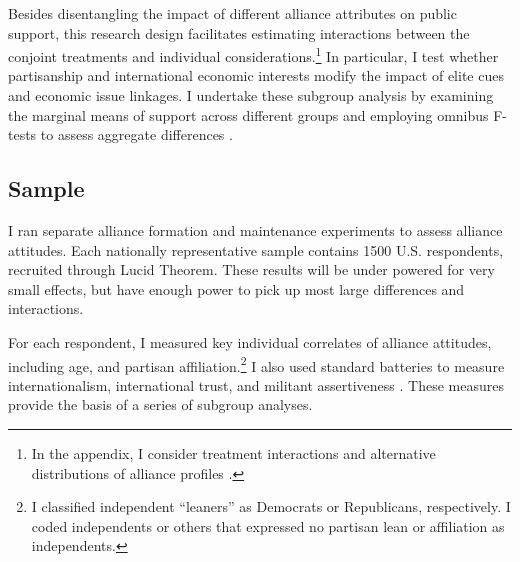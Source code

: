 \documentclass[12pt]{article}
\begin{document}
Besides disentangling the impact of different alliance attributes on public support, this research design facilitates estimating interactions between the conjoint treatments and individual considerations.\footnote{In the appendix, I consider treatment interactions and alternative distributions of alliance profiles \citep{delaCuestaetal2021}.}
In particular, I test whether partisanship and international economic interests modify the impact of elite cues and economic issue linkages. 
I undertake these subgroup analysis by examining the marginal means of support across different groups and employing omnibus F-tests to assess aggregate differences \citep{Leeperetal2020}. 



\subsection{Sample}


I ran separate alliance formation and maintenance experiments to assess alliance attitudes. 
Each nationally representative sample contains 1500 U.S. respondents, recruited through Lucid Theorem.
These results will be under powered for very small effects, but have enough power to pick up most large differences and interactions. 


For each respondent, I measured key individual correlates of alliance attitudes, including age, and partisan affiliation.\footnote{I classified independent ``leaners'' as Democrats or Republicans, respectively. I coded independents or others that expressed no partisan lean or affiliation as independents.}
I also used standard batteries to measure internationalism, international trust, and militant assertiveness \citep{Herrmannetal1999, KertzerBrutger2016}.
These measures provide the basis of a series of subgroup analyses. 
\end{document}
